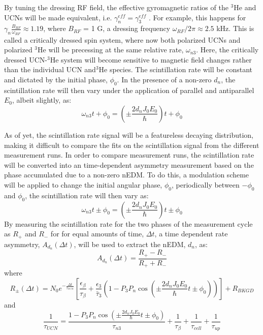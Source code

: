 By tuning the dressing RF field, the effective gyromagnetic ratios of the $^3$He and UCNs will be made equivalent, i.e. $\gamma_{n}^{eff} = \gamma_{3}^{eff}$ . For example, this happens for $\gamma_{n}\frac{B_{RF}}{\omega_{RF}} \approx 1.19$,  where $B_{RF}$ = 1 G, a dressing frequency $\omega_{RF}/2 \pi \approx 2.5$ kHz. This is called a critically dressed spin system, where now both polarized UCNs and polarized $^3$He will be precessing at the same relative rate, $\omega_{n3}$. Here, the critically dressed UCN-$^3$He system will become sensitive to magnetic field changes rather than the individual UCN and$^3$He species. The scintillation rate will be constant and dictated by the initial phase, $\phi_0$. In the presence of a non-zero $d_n$, the scintillation rate will then vary under the application of parallel and antiparallel $E_0$, albeit slightly, as:
\begin{equation}
    \omega_{n3}t + \phi_0 = \left(  \pm \frac{2d_nJ_0E_0}{\hbar} \right) t + \phi_0
\end{equation}

As of yet, the scintillation rate signal will be a featureless decaying distribution, making it difficult to compare the fits on the scintillation signal from the different measurement runs. In order to compare measurement runs, the scintillation rate will be converted into an time-dependent asymmetry measurement based on the phase accumulated due to a non-zero nEDM. To do this, a modulation scheme will be applied to change the initial angular phase, $\phi_0$, periodically between  $- \phi_0$ and $\phi_0$, the scintillation rate will then vary as:
\begin{equation}
    \omega_{n3}t \pm \phi_0 = \left(  \pm \frac{2d_nJ_0E_0}{\hbar} \right) t \pm \phi_0
\end{equation}
By measuring the scintillation rate for the two phases of the measurement cycle as $R_+$ and $R_-$ for for equal amounts of time, $\Delta t$, a time dependent rate asymmetry, $A_{d_{n}}(\Delta t)$, will be used to extract the nEDM, $d_n$, as:
\begin{equation}
    A_{d_{n}}(\Delta t)= \frac{R_+-R_-}{R_++R_-}
\end{equation}
where
\begin{equation}
    R_{\pm}(\Delta t) = N_0 e^{-\frac{\Delta t}{\tau_{UCN}} } \left [ \frac{ \epsilon_\beta}{\tau_\beta} + \frac{\epsilon_3}{\bar{\tau}_3} \left(1-P_3P_n\cos \left(  \pm \frac{2d_nJ_0E_0}{\hbar}  t \pm \phi_0 \right) \right) \right] + R_{BKGD}
\end{equation}
and
\begin{equation}
 \frac{1}{\tau_{UCN}} =\frac{1-P_3P_n\cos\left(  \pm \frac{2d_nJ_0E_0}{\hbar}  t \pm \phi_0 \right)}{\tau_{n3}}
+\frac{1}{\tau_\beta}+\frac{1}{\tau_{cell}}+\frac{1}{\tau_{up}}
\end{equation}

